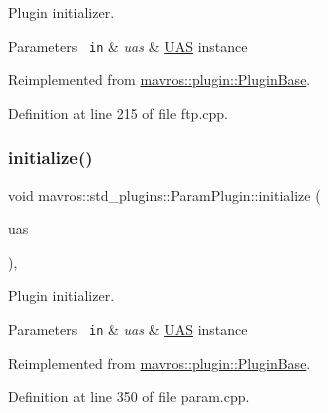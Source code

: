 Plugin initializer. 


\begin{DoxyParams}[1]{Parameters}
\mbox{\texttt{ in}}  & {\em uas} & {\ttfamily \mbox{\hyperlink{classmavros_1_1UAS}{U\+AS}}} instance \\
\hline
\end{DoxyParams}


Reimplemented from \mbox{\hyperlink{group__plugin_gad5313a41da4d26acbbabf008cdc21e82}{mavros\+::plugin\+::\+Plugin\+Base}}.



Definition at line 215 of file ftp.\+cpp.

\mbox{\label{group__plugin_gad1185b49c13a316fd54ef08895ac012e}} 
\subsubsection{\texorpdfstring{initialize()}{initialize()}\hspace{0.1cm}{\footnotesize\ttfamily [40/41]}}
{\footnotesize\ttfamily void mavros\+::std\+\_\+plugins\+::\+Param\+Plugin\+::initialize (\begin{DoxyParamCaption}\item[{\mbox{\hyperlink{classmavros_1_1UAS}{U\+AS}} \&}]{uas }\end{DoxyParamCaption})\hspace{0.3cm}{\ttfamily [inline]}, {\ttfamily [virtual]}}



Plugin initializer. 


\begin{DoxyParams}[1]{Parameters}
\mbox{\texttt{ in}}  & {\em uas} & {\ttfamily \mbox{\hyperlink{classmavros_1_1UAS}{U\+AS}}} instance \\
\hline
\end{DoxyParams}


Reimplemented from \mbox{\hyperlink{group__plugin_gad5313a41da4d26acbbabf008cdc21e82}{mavros\+::plugin\+::\+Plugin\+Base}}.



Definition at line 350 of file param.\+cpp.

\mbox{\label{group__plugin_ga6db82bbd7c82ba5963472e1946431313}} 

